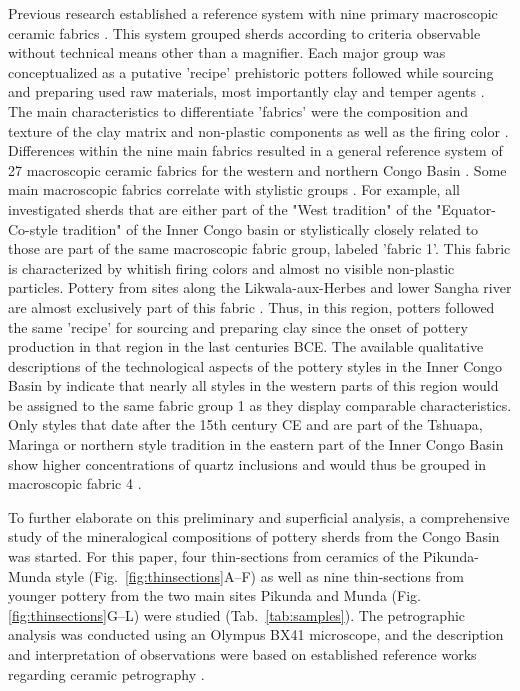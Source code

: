 \documentclass[smallextended,natbib]{svjour3}       %
\begin{document}
Previous research established a reference system with nine primary macroscopic ceramic fabrics \cite[60--69]{Seidensticker.2021e}. This system grouped sherds according to criteria observable without technical means other than a magnifier. Each major group was conceptualized as a putative 'recipe' prehistoric potters followed while sourcing and preparing used raw materials, most importantly clay and temper agents \citep[49]{Lange.2006}. The main characteristics to differentiate 'fabrics' \citep[cf.][38--51]{Riemer.2011} were the composition and texture of the clay matrix and non-plastic components as well as the firing color \citep[34]{Nordstrom.1972}. Differences within the nine main fabrics resulted in a general reference system of 27 macroscopic ceramic fabrics for the western and northern Congo Basin \citep[62--65 Tab.~11]{Seidensticker.2021e}. Some main macroscopic fabrics correlate with stylistic groups \cite[69 Tab.~12]{Seidensticker.2021e}. For example, all investigated sherds that are either part of the "West tradition" of the "Equator-Co-style tradition" of the Inner Congo basin \citep[221--222 Fig.~4]{Wotzka.1995} or stylistically closely related to those are part of the same macroscopic fabric group, labeled 'fabric 1'. This fabric is characterized by whitish firing colors and almost no visible non-plastic particles. Pottery from sites along the Likwala-aux-Herbes and lower Sangha river are almost exclusively part of this fabric \cite[67 Fig.~21]{Seidensticker.2021e}. Thus, in this region, potters followed the same 'recipe' for sourcing and preparing clay since the onset of pottery production in that region in the last centuries BCE. The available qualitative descriptions of the technological aspects of the pottery styles in the Inner Congo Basin by \citet[59--210]{Wotzka.1995} indicate that nearly all styles in the western parts of this region would be assigned to the same fabric group 1 as they display comparable characteristics. Only styles that date after the 15th century CE and are part of the Tshuapa, Maringa or northern style tradition in the eastern part of the Inner Congo Basin show higher concentrations of quartz inclusions and would thus be grouped in macroscopic fabric 4 \citep[62--65 Tab.~11]{Seidensticker.2021e}.

To further elaborate on this preliminary and superficial analysis, a comprehensive study of the mineralogical compositions of pottery sherds from the Congo Basin was started. For this paper, four thin-sections from ceramics of the Pikunda-Munda style (Fig.~\ref{fig:thinsections}A--F) as well as nine thin-sections from younger pottery from the two main sites Pikunda and Munda (Fig.\ref{fig:thinsections}G--L) were studied (Tab.~\ref{tab:samples}). The petrographic analysis was conducted using an Olympus BX41 microscope, and the description and interpretation of observations were based on established reference works regarding ceramic petrography \citep{MacKenzie.2017,Quinn.2022}. 
\end{document}
